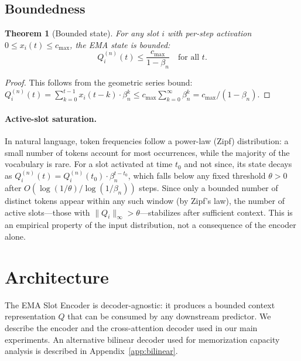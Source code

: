 \documentclass[11pt]{article}
\newtheorem{theorem}{Theorem}
\begin{document}
\subsection{Boundedness}

\begin{theorem}[Bounded state]
For any slot $i$ with per-step activation $0 \le x_i(t) \le c_{\max}$, the EMA state is bounded:
\begin{equation}
Q_i^{(n)}(t) \le \frac{c_{\max}}{1 - \beta_n} \quad \text{for all } t.
\end{equation}
\end{theorem}

\begin{proof}
This follows from the geometric series bound: $Q_i^{(n)}(t) = \sum_{k=0}^{t-1} x_i(t-k) \cdot \beta_n^k \le c_{\max} \sum_{k=0}^{\infty} \beta_n^k = c_{\max}/(1-\beta_n)$.
\end{proof}

\paragraph{Active-slot saturation.}
In natural language, token frequencies follow a power-law (Zipf) distribution: a small number of tokens account for most occurrences, while the majority of the vocabulary is rare. For a slot activated at time $t_0$ and not since, its state decays as $Q_i^{(n)}(t) = Q_i^{(n)}(t_0) \cdot \beta_n^{t - t_0}$, which falls below any fixed threshold $\theta > 0$ after $O(\log(1/\theta) / \log(1/\beta_n))$ steps. Since only a bounded number of distinct tokens appear within any such window (by Zipf's law), the number of active slots---those with $\|Q_i\|_\infty > \theta$---stabilizes after sufficient context. This is an empirical property of the input distribution, not a consequence of the encoder alone.

\section{Architecture}
\label{sec:arch}

The EMA Slot Encoder is decoder-agnostic: it produces a bounded context representation $Q$ that can be consumed by any downstream predictor. We describe the encoder and the cross-attention decoder used in our main experiments. An alternative bilinear decoder used for memorization capacity analysis is described in Appendix~\ref{app:bilinear}.
\end{document}
